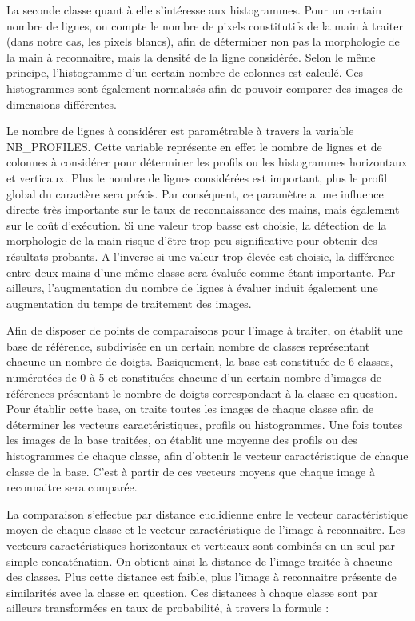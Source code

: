La seconde classe quant à elle s'intéresse aux histogrammes. Pour un certain nombre de lignes, on compte le nombre de pixels constitutifs de la main à traiter (dans notre cas, les pixels blancs), afin de déterminer non pas la morphologie de la main à reconnaitre, mais la densité de la ligne considérée. Selon le même principe, l'histogramme d'un certain nombre de colonnes est calculé. Ces histogrammes sont également normalisés afin de pouvoir comparer des images de dimensions différentes.

Le nombre de lignes à considérer est paramétrable à travers la variable NB\_PROFILES. Cette variable représente en effet le nombre de lignes et de colonnes à considérer pour déterminer les profils ou les histogrammes horizontaux et verticaux. Plus le nombre de lignes considérées est important, plus le profil global du caractère sera précis. Par conséquent, ce paramètre a une influence directe très importante sur le taux de reconnaissance des mains, mais également sur le coût d’exécution. Si une valeur trop basse est choisie, la détection de la morphologie de la main risque d’être trop peu significative pour obtenir des résultats probants. A l’inverse si une valeur trop élevée est choisie, la différence entre deux mains d’une même classe sera évaluée comme étant importante. Par ailleurs, l'augmentation du nombre de lignes à évaluer induit également une augmentation du temps de traitement des images.

	Afin de disposer de points de comparaisons pour l'image à traiter, on établit une base de référence, subdivisée en un certain nombre de classes représentant chacune un nombre de doigts. Basiquement, la base est constituée de 6 classes, numérotées de 0 à 5 et constituées chacune d'un certain nombre d'images de références présentant le nombre de doigts correspondant à la classe en question. Pour établir cette base, on traite toutes les images de chaque classe afin de déterminer les vecteurs caractéristiques, profils ou histogrammes. Une fois toutes les images de la base traitées, on établit une moyenne des profils ou des histogrammes de chaque classe, afin d'obtenir le vecteur caractéristique de chaque classe de la base. C'est à partir de ces vecteurs moyens que chaque image à reconnaitre sera comparée. 	

	La comparaison s'effectue par distance euclidienne entre le vecteur caractéristique moyen de chaque classe et le vecteur caractéristique de l'image à reconnaitre. Les vecteurs caractéristiques horizontaux et verticaux sont combinés en un seul par simple concaténation. On obtient ainsi la distance de l'image traitée à chacune des classes. Plus cette distance est faible, plus l'image à reconnaitre présente de similarités avec la classe en question. Ces distances à chaque classe sont par ailleurs transformées en taux de probabilité, à travers la formule :

